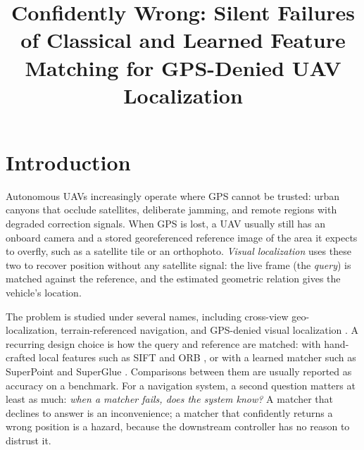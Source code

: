 \documentclass[conference]{IEEEtran}
\begin{document}
\title{Confidently Wrong: Silent Failures of Classical and Learned Feature Matching for GPS-Denied UAV Localization}

\author{
}

\maketitle

\par{}
\vspace{0.6\baselineskip}
\par{}

\section{Introduction}

Autonomous UAVs increasingly operate where GPS cannot be trusted: urban canyons that occlude satellites, deliberate jamming, and remote regions with degraded correction signals. When GPS is lost, a UAV usually still has an onboard camera and a stored georeferenced reference image of the area it expects to overfly, such as a satellite tile or an orthophoto. \emph{Visual localization} uses these two to recover position without any satellite signal: the live frame (the \emph{query}) is matched against the reference, and the estimated geometric relation gives the vehicle's location.

The problem is studied under several names, including cross-view geo-localization, terrain-referenced navigation, and GPS-denied visual localization \cite{zheng2020university,zhu2021vigor,goforth2019gps}. A recurring design choice is how the query and reference are matched: with hand-crafted local features such as SIFT \cite{lowe2004distinctive} and ORB \cite{rublee2011orb}, or with a learned matcher such as SuperPoint and SuperGlue \cite{detone2018superpoint,sarlin2020superglue}. Comparisons between them are usually reported as accuracy on a benchmark. For a navigation system, a second question matters at least as much: \emph{when a matcher fails, does the system know?} A matcher that declines to answer is an inconvenience; a matcher that confidently returns a wrong position is a hazard, because the downstream controller has no reason to distrust it.
\end{document}
